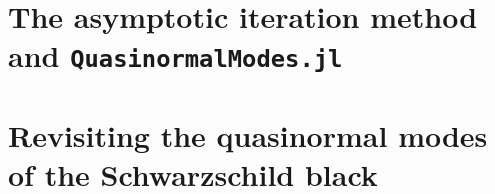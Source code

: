 

\section{The asymptotic iteration method and \texttt{QuasinormalModes.jl}}
\label{ch:qnm_aim:sec:aim}


\section{Revisiting the quasinormal modes of the Schwarzschild black}
\label{ch:qnm_aim:sec:revisiting}
